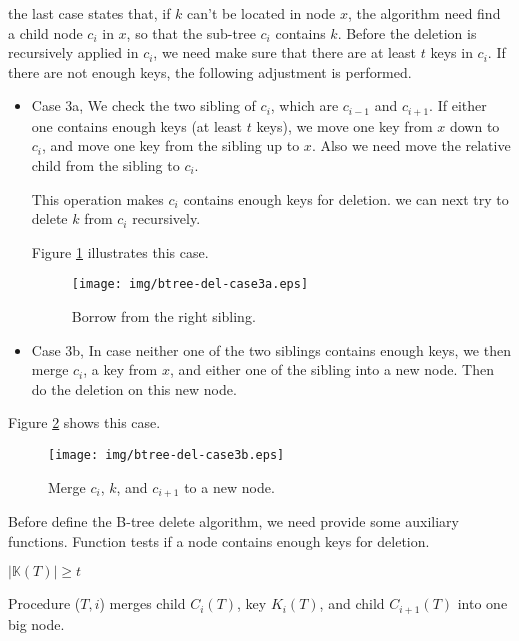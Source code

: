 \documentclass{article}
\begin{document}
the last case states that, if $k$ can't be located in node $x$, the algorithm
need find a child node $c_i$ in $x$, so that the sub-tree $c_i$
contains $k$. Before the deletion is recursively applied in $c_i$, we
need make sure that there are at least $t$ keys in $c_i$. If there are
not enough keys, the following adjustment is performed.

\begin{itemize}
\item Case 3a, We check the two sibling of $c_i$, which are $c_{i-1}$ and $c_{i+1}$.
If either one contains enough keys (at least $t$ keys), we move
one key from $x$ down to $c_i$, and move one key from the sibling up to
$x$. Also we need move the relative child from the sibling to $c_i$.

This operation makes $c_i$ contains enough keys for deletion. we can
next try to delete $k$ from $c_i$ recursively.

Figure \ref{fig:btree-del-case3a} illustrates this case.

\begin{figure}[htbp]
  \centering
    \texttt{[image: img/btree-del-case3a.eps]}
    \caption{Borrow from the right sibling.}
    \label{fig:btree-del-case3a}
\end{figure}

\item Case 3b, In case neither one of the two siblings contains enough keys, we then
merge $c_i$, a key from $x$, and either one of the sibling into a new
node. Then do the deletion on this new node.
\end{itemize}

Figure \ref{fig:btree-del-case3b} shows this case.

\begin{figure}[htbp]
  \centering
    \texttt{[image: img/btree-del-case3b.eps]}
    \caption{Merge $c_i$, $k$, and $c_{i+1}$ to a new node.}
    \label{fig:btree-del-case3b}
\end{figure}

Before define the B-tree delete algorithm, we need provide some auxiliary
functions. Function  tests if a node contains enough keys
for deletion.

\begin{algorithmic}[1]
  \State \Return $|\mathbb{K}(T)| \ge t$
\EndFunction
\end{algorithmic}

Procedure ($T, i$) merges child $C_i(T)$, key $K_i(T)$,
and child $C_{i+1}(T)$ into one big node.
\end{document}
